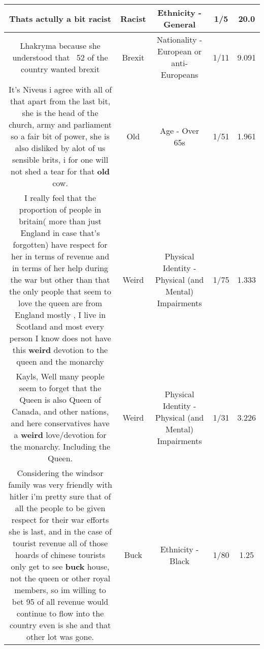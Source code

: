 \documentclass[11pt]{article}
\newlength\mylength
\begin{document}
\begin{center}
\begin{longtable}{|C{.65\mylength}|C{.30\mylength}|C{.12\mylength}|C{.12\mylength}|C{.12\mylength}|}
  \small Thats actully a bit racist\normalsize   & Racist & Ethnicity - General & 1/5 & 20.0 \\  \hline
  \small Lhakryma because she understood that ~52 of the country wanted brexit\normalsize   & Brexit & Nationality - European or anti-Europeans & 1/11 & 9.091 \\  \hline
  \small It's Niveus i agree with all of that apart from the last bit, she is the head of the church, army and parliament so a fair bit of power, she is also disliked by alot of us sensible brits, i for one will not shed a tear for that \textbf{old} cow.\normalsize   & Old & Age - Over 65s & 1/51 & 1.961 \\  \hline
  \small I really feel that the proportion of people in britain( more than just England in case that's forgotten) have respect for her in terms of revenue and in terms of her help during the war but other than that the only people that seem to love the queen are from England mostly , I live in Scotland and most every person I know does not have this \textbf{weird} devotion to the queen and the monarchy\normalsize   & Weird & Physical Identity - Physical (and Mental) Impairments & 1/75 & 1.333 \\  \hline
  \small Kayls, Well many people seem to forget that the Queen is also Queen of Canada, and other nations, and here conservatives have a \textbf{weird} love/devotion for the monarchy. Including the Queen.\normalsize   & Weird & Physical Identity - Physical (and Mental) Impairments & 1/31 & 3.226 \\  \hline
  \small Considering the windsor family was very friendly with hitler i'm pretty sure that of all the people to be given respect for their war efforts she is last, and in the case of tourist revenue all of those hoards of chinese tourists only get to see \textbf{buck} house, not the queen or other royal members, so im willing to bet 95 of all revenue would continue to flow into the country even is she and that other lot was gone.\normalsize   & Buck & Ethnicity - Black & 1/80 & 1.25 \\  \hline

\end{longtable}
\end{center}
\end{document}
